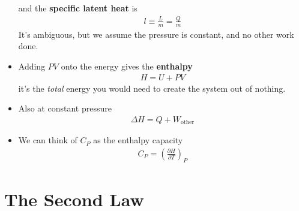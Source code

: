 \documentclass{book}
\begin{document}
\begin{itemize}
	      and the \textbf{specific latent heat} is
	      \begin{align}
		      \label{eq:specific latent}
		      l \equiv \frac{L}{m}= \frac{Q}{m}
	      \end{align}
	      It's ambiguous, but we assume the pressure is constant, and no other work done.
	\item Adding $PV$ onto the energy gives the \textbf{enthalpy}
	      \begin{align}
		      \label{eq:enthalpy}
		      H = U + PV
	      \end{align}
	      it's the \textit{total} energy you would need to create the system out of nothing.
  \item Also at constant pressure
				\begin{align}
					\Delta{H} = Q + W_\text{other}
				\end{align}
  \item We can think of $C_P$ as the enthalpy capacity
				\begin{align}
					C_P = \left( \frac{\partial H}{\partial T} \right)_P
				\end{align}




\end{itemize}


\chapter{The Second Law}
\end{document}
